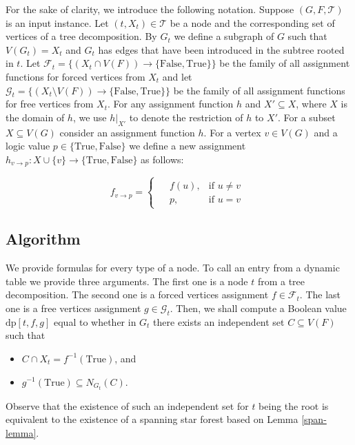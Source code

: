 \documentclass[en]{pracamgr}
\theoremstyle{definition}
\newcommand{\dpt}[1]{\textrm{dp}[#1]}
\newcommand{\true}{\textrm{True}}
\newcommand{\false}{\textrm{False}}
\begin{document}
For the sake of clarity, we introduce the following notation. Suppose $(G,F,\mathcal{T})$ is an input instance. Let $(t,X_t) \in \mathcal{T}$ be a node and the corresponding set of vertices of a tree decomposition. By $G_t$ we define a subgraph of $G$ such that $V(G_t) = X_t$ and $G_t$ has edges that have been introduced in the subtree rooted in $t$. Let $\mathcal{F}_t = \{(X_t \cap V(F)) \rightarrow \{\false,\true\}\}$ be the family of all assignment functions for forced vertices from $X_t$ and let $\mathcal{G}_t = \{(X_t \setminus V(F)) \rightarrow \{\false,\true\}\}$ be the family of all assignment functions for free vertices from $X_t$. For any assignment function $h$ and $X' \subseteq X$, where $X$ is the domain of $h$, we use $h|_{X'}$ to denote the restriction of $h$ to $X'$. For a subset $X \subseteq V(G)$ consider an assignment function $h$. For a vertex $v \in V(G)$ and a logic value $p \in \{\true, \false\}$ we define a new assignment $h_{v \rightarrow p}: X \cup \{v\} \rightarrow \{\true, \false\}$ as follows:

\begin{equation*}
	f_{v \rightarrow p} =
	\begin{cases}
	\begin{aligned}
		&f(u), & \text{if $u \neq v$} \\
		&p, &\text{if $u = v$}
	\end{aligned}
	\end{cases}
\end{equation*}

\subsection{Algorithm}

We provide formulas for every type of a node. To call an entry from a dynamic table we provide three arguments. The first one is a node $t$ from a tree decomposition. The second one is a forced vertices assignment $f \in \mathcal{F}_t$. The last one is  a free vertices assignment $g \in \mathcal{G}_t$. Then, we shall compute a Boolean value $\dpt{t,f,g}$ equal to whether in $G_t$ there exists an independent set $C \subseteq V(F)$ such that
\begin{itemize}
	\item $C \cap X_t = f^{-1}(\true)$, and
	\item $g^{-1}(\true) \subseteq N_{G_t}(C)$.
\end{itemize}

Observe that the existence of such an independent set for $t$ being the root is equivalent to the existence of a spanning star forest based on Lemma \ref{span-lemma}.
\end{document}
